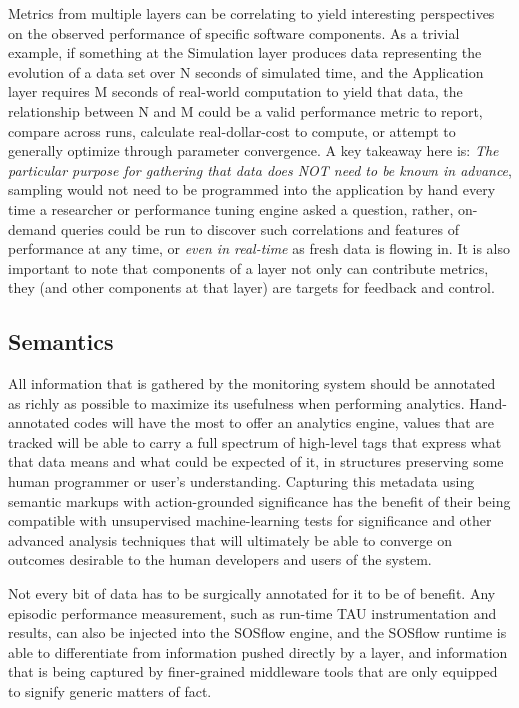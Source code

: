 Metrics from multiple layers can be correlating to yield interesting
perspectives on the observed performance of specific software
components.
%
As a trivial example, if something at the Simulation layer produces data
representing the evolution of a data set over N seconds of simulated
time, and the Application layer requires M seconds of real-world
computation to yield that data, the relationship between N and M could
be a valid performance metric to report, compare across runs,
calculate real-dollar-cost to compute, or attempt to generally
optimize through parameter convergence.
%
A key takeaway here is: \textit{The particular purpose for gathering
  that data does NOT need to be known in advance}, sampling would not
need to be programmed into the application by hand every time a
researcher or performance tuning engine asked a question, rather,
on-demand queries could be run to discover such correlations and
features of performance at any time, or \textit{even in real-time} as
fresh data is flowing in.
%
It is also important to note that components of a layer not only can
contribute metrics, they (and other components at that layer) are
targets for feedback and control.


\subsection{Semantics}

All information that is gathered by the monitoring system should be
annotated as richly as possible to maximize its usefulness when
performing analytics.
%
Hand-annotated codes will have the most to offer an analytics engine,
values that are tracked will be able to carry a full spectrum of
high-level tags that express what that data means and what could be
expected of it, in structures preserving some human programmer or
user's understanding.
%
Capturing this metadata using semantic markups with action-grounded
significance has the benefit of their being compatible with
unsupervised machine-learning tests for significance and other
advanced analysis techniques that will ultimately be able to converge
on outcomes desirable to the human developers and users of the system.

Not every bit of data has to be surgically annotated for it to be of
benefit.
%
Any episodic performance measurement, such as run-time TAU
instrumentation and results, can also be injected into the SOSflow
engine, and the SOSflow runtime is able to differentiate from
information pushed directly by a layer, and information that is being
captured by finer-grained middleware tools that are only equipped to
signify generic matters of fact.

